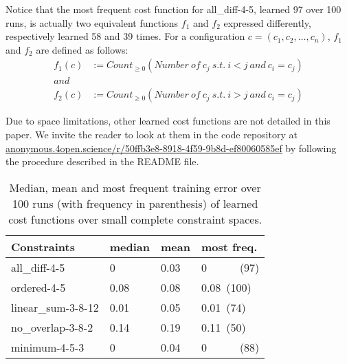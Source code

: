 \documentclass{article}
\begin{document}
Notice that the most frequent cost function for all\_diff-4-5, learned 97 over 100 runs, is actually two equivalent functions $f_1$ and $f_2$ expressed differently,  respectively learned 58  and 39 times.   For a configuration  $c =  (c_1, c_2,  \ldots,  c_n)$, $f_1$  and $f_2$  are
defined as follows:
\begin{align*}
  f_1(c) &:= Count_{\geq 0}( Number\ of\ c_j\ s.t.\ i<j\ and\ c_i=c_j)\\
  and&\\
  f_2(c) &:= Count_{\geq 0}( Number\ of\ c_j\ s.t.\ i>j\ and\ c_i=c_j)
\end{align*}

Due to space limitations, other learned cost functions are not detailed in this paper.   We invite the reader to look  at them in the code                           repository                           at \href{https://anonymous.4open.science/r/50ffb3e8-8918-4f59-9b8d-ef80060585ef/}{anonymous.4open.science/r/50ffb3e8-8918-4f59-9b8d-ef80060585ef} by following the procedure described in the README file.






\begin{table}
  \centering
\begin{tabular}{|l|l|l|l|}
  \hline
  Constraints & median & mean & most freq.\\
  \hline
  all\_diff-4-5 & 0 & 0.03 & 0~~~~~~(97)\\
  ordered-4-5 & 0.08 & 0.08 & 0.08~(100)\\
  linear\_sum-3-8-12 & 0.01 & 0.05 & 0.01~(74)\\
  no\_overlap-3-8-2 & 0.14 & 0.19 & 0.11~(50)\\
  minimum-4-5-3 & 0 & 0.04 & 0~~~~~~(88)\\
  \hline
\end{tabular}
\caption{Median, mean and  most frequent training error  over 100 runs
  (with frequency in parenthesis) of learned cost functions over small
  complete constraint spaces.}
\label{tab:cf_small}
\end{table}
\end{document}

